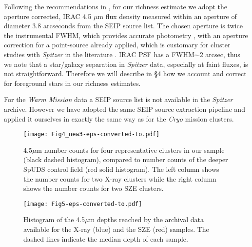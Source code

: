 \documentclass[apj,twocolumn]{emulateapj}
\begin{document}
{Following the recommendations in \citet{Surace04}, for our richness estimate we adopt the aperture corrected, IRAC 4.5 $\mu$m flux density measured within an aperture of diameter 3.8 arcseconds from the SEIP source list. The chosen aperture is twice the instrumental FWHM, which provides accurate photometry , with an aperture correction for a point-source already applied, which is customary for cluster studies with {\it Spitzer} in the literature  \citep[e.g.,][]{Bremer06, Rettura06}. IRAC PSF has a FWHM$\sim$2 arcsec, thus we note that a star/galaxy separation in {\it Spitzer} data, especially at faint fluxes, is not straightforward. Therefore we will describe in \S 4 how we account and correct for foreground stars in our richness estimates.
 
For the {\it Warm Mission} data a SEIP source list is not available in the {\it Spitzer} archive. However we  have adopted the same SEIP source extraction pipeline and applied it ourselves in exactly the same way as for the {\it Cryo} mission clusters.  

\begin{figure}[t!]
\texttt{[image: Fig4\_new3-eps-converted-to.pdf]}
\caption{4.5$\mu$m number counts  for four representative clusters in our sample (black dashed histogram), compared to number counts of the deeper SpUDS control field (red solid histogram). The left column shows the number counts for two X-ray  clusters while the right column shows the number counts for two SZE clusters.}
\label{numcounts}
\end{figure}

\begin{figure}[t!]
\texttt{[image: Fig5-eps-converted-to.pdf]}
\caption{Histogram of the 4.5$\mu$m depths reached by the archival data available for the  X-ray (blue) and the SZE (red) samples. The dashed lines indicate the median depth of each sample.}
\label{histodepth}
\end{figure}

}
\end{document}
